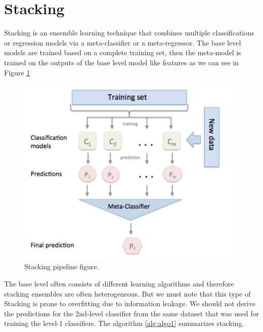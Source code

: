 \section{Stacking}
Stacking is an ensemble learning technique that combines multiple classifications or regression models via a meta-classifier or a meta-regressor. The base level models are trained based on a complete training set, then the meta-model is trained on the outputs of the base level model like features as we can see in Figure \ref{fig:stacking}

\begin{figure}[htbp]
    \centering
    \includegraphics[width=\textwidth]{./Figure/stacking.png}
    \caption{Stacking pipeline figure.}
    \label{fig:stacking}
\end{figure}


The base level often consists of different learning algorithms and therefore stacking ensembles are often heterogeneous. But we must note that this type of Stacking is prone to overfitting due to information leakage. We should not derive the predictions for the 2nd-level classifier from the same dataset that was used for training the level-1 classifiers. The algorithm \ref{alg:algo1} summarizes stacking.

